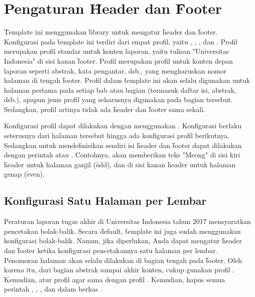 \section{Pengaturan \f{Header} dan \f{Footer}}
\label{sec:fancyhdr}
\f{Template} ini menggunakan \f{library}  untuk mengatur \f{header} dan \f{footer}. Konfigurasi  pada \f{template} ini terdiri dari empat profil, yaitu , , , dan . Profil  merupakan profil standar untuk konten laporan, yaitu tulisan "Universitas Indonesia" di sisi kanan \f{footer}. Profil  merupakan profil untuk konten depan laporan seperti abstrak, kata pengantar, dsb., yang mengharuskan nomor halaman di tengah \f{footer}. Profil  dalam \f{template} ini akan selalu digunakan untuk halaman pertama pada setiap bab atau bagian (termasuk daftar isi, abstrak, dsb.), apapun jenis profil yang seharusnya digunakan pada bagian tersebut. Sedangkan, profil  artinya tidak ada \f{header} dan \f{footer} sama sekali.

Konfigurasi profil dapat dilakukan dengan menggunakan . Konfigurasi berlaku seterusnya dari halaman tersebut hingga ada konfigurasi profil berikutnya. Sedangkan untuk mendefinisikan sendiri isi \f{header} dan \f{footer} dapat dilakukan dengan perintah  atau . Contohnya,  akan memberikan teks "Meong" di sisi kiri \f{header} untuk halaman ganjil (\f{odd}), dan di sisi kanan \f{header} untuk halaman genap (\f{even}).


\subsection{Konfigurasi Satu Halaman per Lembar}
\label{sec:onePerSheet}
Peraturan laporan tugas akhir di Universitas Indonesia tahun 2017 mensyaratkan pencetakan bolak-balik. Secara \f{default}, \f{template} ini juga sudah menggunakan konfigurasi bolak-balik. Namun, jika diperlukan, Anda dapat mengatur \f{header} dan \f{footer} ketika konfigurasi pencetakannya satu halaman per lembar. Penomoran halaman akan selalu dilakukan di bagian tengah pada \f{footer}. Oleh karena itu, dari bagian abstrak sampai akhir konten, cukup gunakan profil . Kemudian, atur profil  agar sama dengan profil . Kemudian, hapus semua perintah , , , dan  dalam berkas .


